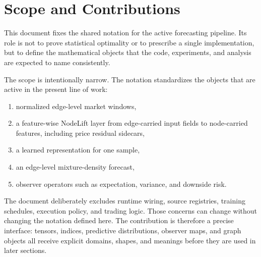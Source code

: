 \section{Scope and Contributions}
\label{sec:scope-and-contributions}

This document fixes the shared notation for the active \Cuwacunu{} forecasting
pipeline.  Its role is not to prove statistical optimality or to prescribe a
single implementation, but to define the mathematical objects that the code,
experiments, and analysis are expected to name consistently.

The scope is intentionally narrow.  The notation standardizes the objects that
are active in the present line of work:
\begin{enumerate}
  \item normalized edge-level market windows,
  \item a feature-wise NodeLift layer from edge-carried input fields to
  node-carried features, including price residual sidecars,
  \item a learned representation for one sample,
  \item an edge-level mixture-density forecast,
  \item observer operators such as expectation, variance, and downside risk.
\end{enumerate}

The document deliberately excludes runtime wiring, source registries, training
schedules, execution policy, and trading logic.  Those concerns can change
without changing the notation defined here.  The contribution is therefore a
precise interface: tensors, indices, predictive distributions, observer maps, and graph
objects all receive explicit domains, shapes, and meanings before they are used
in later sections.
